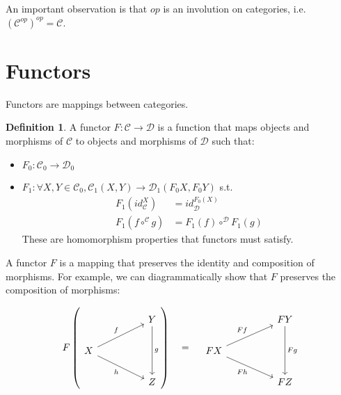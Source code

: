 \documentclass[12pt]{article}
\theoremstyle{plain}
\theoremstyle{definition}
\newtheorem{definition}{Definition}
\theoremstyle{remark}
\newcommand{\cat}[1]{\mathcal{#1}}
\begin{document}
An important observation is that $op$ is an involution on categories, i.e. $(\cat{C}^{op})^{op} = \cat{C}$.

\section{Functors}

Functors are mappings between categories.

\begin{definition}
  A functor $F: \cat{C} \rightarrow \cat{D}$ is a function that maps objects and morphisms of $\cat{C}$ to objects and morphisms of $\cat{D}$ such that:
  \begin{itemize}
    \item $F_0 : \cat{C}_0 \rightarrow \cat{D}_0$
    \item $F_1 : \forall X, Y \in \cat{C}_0, \cat{C}_1(X, Y) \rightarrow \cat{D}_1(F_0 X, F_0 Y)$ s.t.
      \begin{align*}
        F_1(id_\cat{C}^X) &= id_\cat{D}^{F_0(X)} \\
        F_1(f \circ^{\cat{C}} g) &= F_1(f) \circ^{\cat{D}} F_1(g)
      \end{align*}
      These are homomorphism properties that functors must satisfy.
  \end{itemize}
\end{definition}

A functor $F$ is a mapping that preserves the identity and composition of morphisms. For example, we can diagrammatically show that $F$ preserves the composition of morphisms:

\[F\left(\begin{tikzcd}
	&& Y \\
	X \\
	&& Z
	\arrow["g", from=1-3, to=3-3]
	\arrow["f", from=2-1, to=1-3]
	\arrow["h"', from=2-1, to=3-3]
\end{tikzcd}\right) \quad = \quad \begin{tikzcd}
	&& FY \\
	FX \\
	&& FZ
	\arrow["Fg", from=1-3, to=3-3]
	\arrow["Ff", from=2-1, to=1-3]
	\arrow["Fh"', from=2-1, to=3-3]
\end{tikzcd}\]
\end{document}

